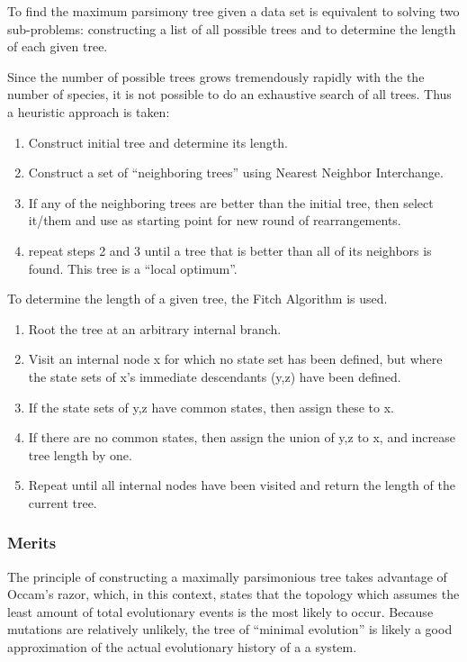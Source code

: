\documentclass[10pt,twocolumn]{article}
\begin{document}
To find the maximum parsimony tree given a data set is equivalent to solving two sub-problems: constructing a list of all possible trees and to determine the length of each given tree.

Since the number of possible trees grows tremendously rapidly with the the number of species, it is not possible to do an exhaustive search of all trees. Thus a heuristic approach is taken:
\begin{enumerate}
\item Construct initial tree and determine its length.
\item Construct a set of ``neighboring trees'' using Nearest Neighbor Interchange.
\item If any of the neighboring trees are better than the initial tree, then select it/them and use as starting point for new round of rearrangements.
\item repeat steps 2 and 3 until a tree that is better than all of its neighbors is found. This tree is a ``local optimum''.
\end{enumerate}

To determine the length of a given tree, the Fitch Algorithm is used.
\begin{enumerate}
\item Root the tree at an arbitrary internal branch.
\item Visit an internal node x for which no state set has been defined, but where the state sets of x's immediate descendants (y,z) have been defined.
\item If the state sets of y,z have common states, then assign these to x.
\item If there are no common states, then assign the union of y,z to x, and increase tree length by one.
\item Repeat until all internal nodes have been visited and return the length of the current tree.
\end{enumerate}

\subsubsection*{Merits}
The principle of constructing a maximally parsimonious tree takes advantage of Occam's razor, which, in this context, states that the topology which assumes the least amount of total evolutionary events is the most likely to occur. Because mutations are relatively unlikely, the tree of ``minimal evolution'' is likely a good approximation of the actual evolutionary history of a a system.
\end{document}
